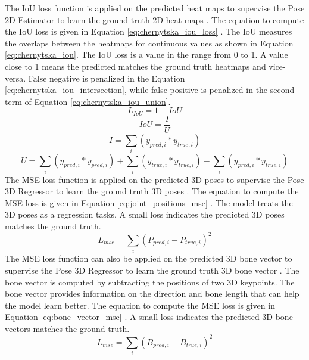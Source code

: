 \noindent
The IoU loss function is applied on the predicted heat maps to supervise the Pose 2D Estimator to learn the ground truth 2D heat maps \cite{olha}. The equation to compute the IoU loss is given in Equation \ref{eq:chernytska_iou_loss} \cite{olha}. The IoU measures the overlaps between the heatmaps for continuous values as shown in Equation \ref{eq:chernytska_iou}. The IoU loss is a value in the range from 0 to 1. A value close to 1 means the predicted matches the ground truth heatmaps and vice-versa. False negative is penalized in the Equation \ref{eq:chernytska_iou_intersection}, while false positive is penalized in the second term of Equation \ref{eq:chernytska_iou_union}.
\begin{equation}
L_{IoU} = 1 - IoU \label{eq:chernytska_iou_loss}
\end{equation}
\begin{equation}
IoU = \frac{I}{U} \label{eq:chernytska_iou}
\end{equation}
\begin{equation}
I = \sum_{i} (y_{pred,i} * y_{true,i}) \label{eq:chernytska_iou_intersection}
\end{equation}
\begin{equation}
U = \sum_{i} (y_{pred,i} * y_{pred,i}) + \sum_{i} (y_{true,i} * y_{true,i}) - \sum_{i} (y_{pred,i} * y_{true,i}) \label{eq:chernytska_iou_union}
\end{equation}
\noindent
The MSE loss function is applied on the predicted 3D poses to supervise the Pose 3D Regressor to learn the ground truth 3D poses \cite{semgcn, poseestimationreview}. The equation to compute the MSE loss is given in Equation \ref{eq:joint_positions_mse} \cite{semgcn, poseestimationreview}. The model treats the 3D poses as a regression tasks. A small loss indicates the predicted 3D poses matches the ground truth.
\begin{equation}
L_{mse} = \sum_{i} (P_{pred,i} - P_{true,i})^{2}\label{eq:joint_positions_mse}
\end{equation}
\noindent
The MSE loss function can also be applied on the predicted 3D bone vector to supervise the Pose 3D Regressor to learn the ground truth 3D bone vector \cite{semgcn}. The bone vector is computed by subtracting the positions of two 3D keypoints. The bone vector provides information on the direction and bone length that can help the model learn better. The equation to compute the MSE loss is given in Equation \ref{eq:bone_vector_mse} \cite{semgcn}. A small loss indicates the predicted 3D bone vectors matches the ground truth.
\begin{equation}
L_{mse} = \sum_{i} (B_{pred,i} - B_{true,i})^{2}\label{eq:bone_vector_mse}
\end{equation}


